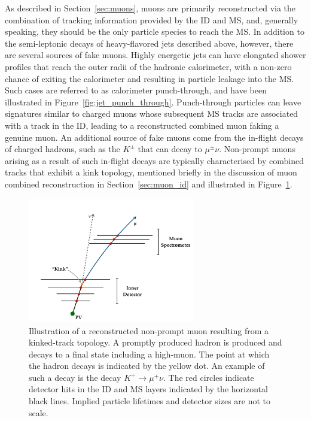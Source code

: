 As described in Section~\ref{sec:muons}, muons are primarily reconstructed via the combination
of tracking information provided by the ID and MS, and, generally speaking, they should be the only particle species to reach
the MS.
In addition to the semi-leptonic decays of heavy-flavored jets described above, however,
there are several sources of fake muons.
Highly energetic jets can have elongated shower profiles that reach the outer
radii of the hadronic calorimeter, with a non-zero chance of exiting the calorimeter
and resulting in particle leakage into the MS.
Such cases are referred to as calorimeter punch-through, and have been illustrated
in Figure~\ref{fig:jet_punch_through}.
Punch-through particles can leave signatures similar to charged muons whose subsequent
MS tracks are associated with a track in the ID, leading to a reconstructed combined muon
faking a genuine muon.
An additional source of fake muons come from the in-flight decays of charged hadrons,
such as the $K^\pm$ that can decay to $\mu^{\pm} \nu$.
Non-prompt muons arising as a result of such in-flight decays are typically
characterised by combined tracks that exhibit a kink topology, mentioned briefly
in the discussion of muon combined reconstruction in Section~\ref{sec:muon_id} and
illustrated in Figure~\ref{fig:fake_muon_kink}.

\begin{figure}[!htb]
    \begin{center}
        \includegraphics[width=0.65\textwidth]{figures/common_ana/fake_muon_kinkPDF}
        \caption{
            Illustration of a reconstructed non-prompt muon resulting from a kinked-track topology.
            A promptly produced hadron is produced and decays to a final state including a
            high-\pT muon.
            The point at which the hadron decays is indicated by the yellow dot.
            An example of such a decay is the decay $K^+ \rightarrow \mu^+ \nu$.
            The red circles indicate detector hits in the ID and MS layers indicated
            by the horizontal black lines.
            Implied particle lifetimes and detector sizes are not to scale.
        }
        \label{fig:fake_muon_kink}
    \end{center}
\end{figure}


